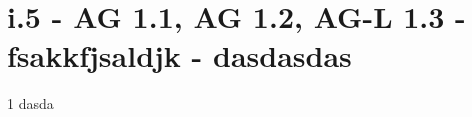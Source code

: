 \section{i.5 - AG 1.1, AG 1.2, AG-L 1.3 - fsakkfjsaldjk - dasdasdas}

\begin{langesbeispiel}\item[1] %
dasda

\end{langesbeispiel}